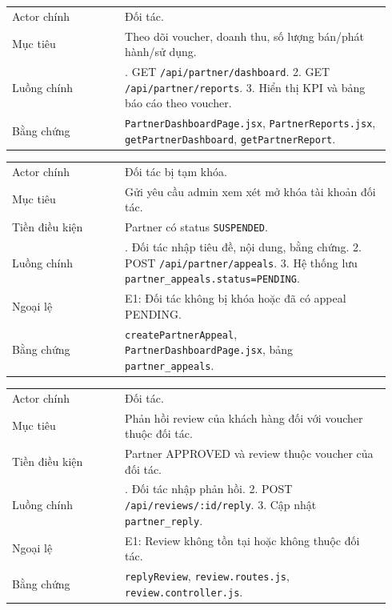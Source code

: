 \begin{longtable}{>{\raggedright\arraybackslash}p{0.28\linewidth}>{\raggedright\arraybackslash}p{0.66\linewidth}}
Actor chính & Đối tác.\\
Mục tiêu & Theo dõi voucher, doanh thu, số lượng bán/phát hành/sử dụng.\\
Luồng chính & 1. GET \texttt{/api/partner/dashboard}. 2. GET \texttt{/api/partner/reports}. 3. Hiển thị KPI và bảng báo cáo theo voucher.\\
Bằng chứng & \texttt{PartnerDashboardPage.jsx}, \texttt{PartnerReports.jsx}, \texttt{getPartnerDashboard}, \texttt{getPartnerReport}.\\
\end{longtable}

\begin{longtable}{>{\raggedright\arraybackslash}p{0.28\linewidth}>{\raggedright\arraybackslash}p{0.66\linewidth}}
Actor chính & Đối tác bị tạm khóa.\\
Mục tiêu & Gửi yêu cầu admin xem xét mở khóa tài khoản đối tác.\\
Tiền điều kiện & Partner có status \texttt{SUSPENDED}.\\
Luồng chính & 1. Đối tác nhập tiêu đề, nội dung, bằng chứng. 2. POST \texttt{/api/partner/appeals}. 3. Hệ thống lưu \texttt{partner\_appeals.status=PENDING}.\\
Ngoại lệ & E1: Đối tác không bị khóa hoặc đã có appeal PENDING.\\
Bằng chứng & \texttt{createPartnerAppeal}, \texttt{PartnerDashboardPage.jsx}, bảng \texttt{partner\_appeals}.\\
\end{longtable}

\begin{longtable}{>{\raggedright\arraybackslash}p{0.28\linewidth}>{\raggedright\arraybackslash}p{0.66\linewidth}}
Actor chính & Đối tác.\\
Mục tiêu & Phản hồi review của khách hàng đối với voucher thuộc đối tác.\\
Tiền điều kiện & Partner APPROVED và review thuộc voucher của đối tác.\\
Luồng chính & 1. Đối tác nhập phản hồi. 2. POST \texttt{/api/reviews/:id/reply}. 3. Cập nhật \texttt{partner\_reply}.\\
Ngoại lệ & E1: Review không tồn tại hoặc không thuộc đối tác.\\
Bằng chứng & \texttt{replyReview}, \texttt{review.routes.js}, \texttt{review.controller.js}.\\
\end{longtable}

